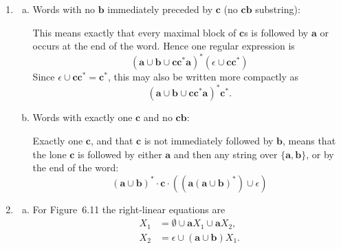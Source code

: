 \begin{enumerate}[{6.}1.]
\begin{enumerate}[(a)]
  \item Words with exactly two $\pmb{c}$s and no $\pmb{ab}$:

  Over $\{\pmb{a},\pmb{b}\}$, avoiding $\pmb{ab}$ means that once an
  $\pmb{a}$ appears, only $\pmb{a}$s may follow; hence the $\pmb{a}/\pmb{b}$
  portions are exactly $\pmb{b}^*\pmb{a}^*$.  Therefore the desired language is
  \[
    \pmb{b}^*\pmb{a}^*\pmb{c}\pmb{b}^*\pmb{a}^*\pmb{c}\pmb{b}^*\pmb{a}^*.
  \]
\end{enumerate}

\item \begin{enumerate}[(a)]
  \item Words with no $\pmb{b}$ immediately preceded by $\pmb{c}$ (no $\pmb{cb}$ substring):

  This means exactly that every maximal block of $\pmb{c}$s is followed by
  $\pmb{a}$ or occurs at the end of the word.  Hence one regular expression is
	  \[
	    (\pmb{a}\cup\pmb{b}\cup\pmb{c}\pmb{c}^*\pmb{a})^*(\epsilon\cup\pmb{c}\pmb{c}^*)
	  \]
	  Since $\epsilon\cup\pmb{c}\pmb{c}^*=\pmb{c}^*$, this may also be written more
	  compactly as
	  \[
	    (\pmb{a}\cup\pmb{b}\cup\pmb{c}\pmb{c}^*\pmb{a})^*\pmb{c}^*.
	  \]

	  \item Words with exactly one $\pmb{c}$ and no $\pmb{cb}$:

  Exactly one $\pmb{c}$, and that $\pmb{c}$ is not immediately followed by
  $\pmb{b}$, means that the lone $\pmb{c}$ is followed by either $\pmb{a}$
  and then any string over $\{\pmb{a},\pmb{b}\}$, or by the end of the word:
  \[
    (\pmb{a}\cup\pmb{b})^*\cdot\pmb{c}\cdot((\pmb{a}(\pmb{a}\cup\pmb{b})^*)\cup\epsilon)
  \]
\end{enumerate}

\item \begin{enumerate}[(a)]
  \item For Figure~6.11 the right-linear equations are
	  \begin{align*}
	    X_1 &= \emptyset \cup \pmb{a}X_1 \cup \pmb{a}X_2,\\
	    X_2 &= \epsilon \cup (\pmb{a}\cup\pmb{b})X_1.
	  \end{align*}


\end{enumerate}
\end{enumerate}
